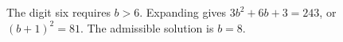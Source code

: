 The digit six requires $b>6$. Expanding gives $3b^2+6b+3=243$, or $(b+1)^2=81$. The admissible solution is $\boxed{b=8}$.
